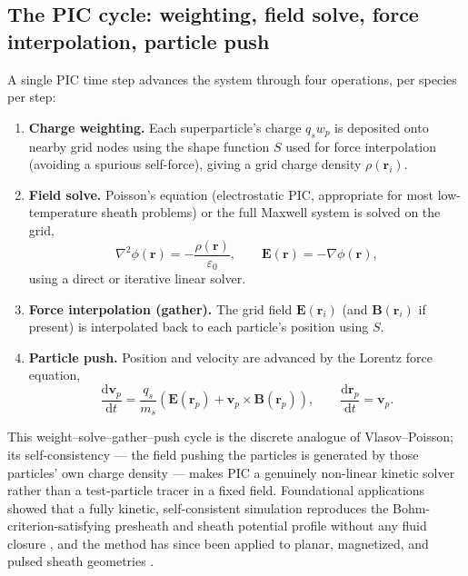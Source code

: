 \subsection{The PIC cycle: weighting, field solve, force interpolation, particle push}

A single PIC time step advances the system through four operations, per species per step:

\begin{enumerate}
\item \textbf{Charge weighting.} Each superparticle's charge $q_{s}w_{p}$ is deposited onto nearby grid nodes using the shape function $S$ used for force interpolation (avoiding a spurious self-force), giving a grid charge density $\rho(\mathbf{r}_{i})$.
\item \textbf{Field solve.} Poisson's equation (electrostatic PIC, appropriate for most low-temperature sheath problems) or the full Maxwell system is solved on the grid,
\begin{equation}
\nabla^{2}\phi(\mathbf{r}) = -\frac{\rho(\mathbf{r})}{\varepsilon_{0}}, \qquad \mathbf{E}(\mathbf{r}) = -\nabla \phi(\mathbf{r}),
\label{ch13-eq:poisson}
\end{equation}
using a direct or iterative linear solver.
\item \textbf{Force interpolation (gather).} The grid field $\mathbf{E}(\mathbf{r}_{i})$ (and $\mathbf{B}(\mathbf{r}_{i})$ if present) is interpolated back to each particle's position using $S$.
\item \textbf{Particle push.} Position and velocity are advanced by the Lorentz force equation,
\begin{equation}
\frac{\mathrm{d}\mathbf{v}_{p}}{\mathrm{d}t} = \frac{q_{s}}{m_{s}}\left(\mathbf{E}(\mathbf{r}_{p}) + \mathbf{v}_{p}\times\mathbf{B}(\mathbf{r}_{p})\right), \qquad \frac{\mathrm{d}\mathbf{r}_{p}}{\mathrm{d}t} = \mathbf{v}_{p}.
\label{eq:lorentz}
\end{equation}
\end{enumerate}
This weight--solve--gather--push cycle is the discrete analogue of Vlasov--Poisson; its self-consistency --- the field pushing the particles is generated by those particles' own charge density --- makes PIC a genuinely non-linear kinetic solver rather than a test-particle tracer in a fixed field. Foundational applications showed that a fully kinetic, self-consistent simulation reproduces the Bohm-criterion-satisfying presheath and sheath potential profile without any fluid closure \cite{ref0631}, and the method has since been applied to planar, magnetized, and pulsed sheath geometries \cite{ref0633}.

